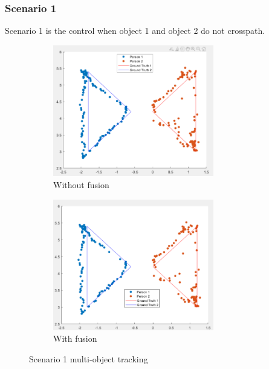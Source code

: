 \subsubsection{Scenario 1}\label{sec:3-exp_result1}
Scenario 1 is the control when object 1 and object 2 do not crosspath.
\begin{figure}[hbpt]
    \centering
    \begin{subfigure}{0.3\linewidth}
        \includegraphics[width=7cm]{Figures/1_before.png}
        \caption{Without fusion}
        \label{subfig:without_fusion_1}
    \end{subfigure}
    \hspace{0.15\textwidth}
    \begin{subfigure}{0.3\linewidth}
        \includegraphics[width=7cm]{Figures/1_after.png}
        \caption{With fusion}
        \label{subfig:with_fusion_1}
    \end{subfigure}

    \caption{Scenario 1 multi-object tracking}
    \label{fig:scenario_result_1}
\end{figure}


